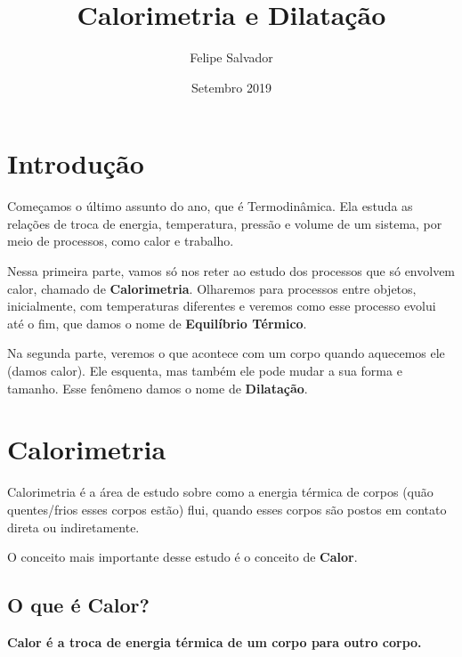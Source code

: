 \documentclass[12pt]{extarticle}
\title{Calorimetria e Dilatação}
\author{Felipe Salvador}
\date{Setembro 2019}
\newcommand{\<}{\langle}
\renewcommand{\>}{\rangle}
\theoremstyle{definition}
\begin{document}
\maketitle

\section*{Introdução}

Começamos o último assunto do ano, que é Termodinâmica. Ela estuda as relações de troca de energia, temperatura, pressão e volume de um sistema, por meio de processos, como calor e trabalho.

Nessa primeira parte, vamos só nos reter ao estudo dos processos que só envolvem calor, chamado de \textbf{Calorimetria}. Olharemos para processos entre objetos, inicialmente, com temperaturas diferentes e veremos como esse processo evolui até o fim, que damos o nome de \textbf{Equilíbrio Térmico}.

Na segunda parte, veremos o que acontece com um corpo quando aquecemos ele (damos calor). Ele esquenta, mas também ele pode mudar a sua forma e tamanho. Esse fenômeno damos o nome de \textbf{Dilatação}.

\section{Calorimetria}

Calorimetria é a área de estudo sobre como a energia térmica de corpos (quão quentes/frios esses corpos estão) flui, quando esses corpos são postos em contato direta ou indiretamente.

O conceito mais importante desse estudo é o conceito de \textbf{Calor}.

\subsection{O que é Calor?}

\textbf{Calor é a troca de energia térmica de um corpo para outro corpo.} 
\end{document}
